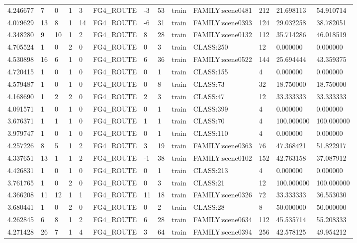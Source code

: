 \begin{tabular}{lllllllllllll}
4.246677 & 7 & 0 & 1 & 3 & FG4\_ROUTE & -3 & 53 & train & FAMILY:scene0481 & 212 & 21.698113 & 54.910714 \\
4.079629 & 13 & 8 & 1 & 14 & FG4\_ROUTE & -6 & 31 & train & FAMILY:scene0393 & 124 & 29.032258 & 38.782051 \\
4.348280 & 9 & 10 & 1 & 2 & FG4\_ROUTE & 8 & 28 & train & FAMILY:scene0132 & 112 & 35.714286 & 46.018519 \\
4.705524 & 1 & 0 & 2 & 0 & FG4\_ROUTE & 0 & 3 & train & CLASS:250 & 12 & 0.000000 & 0.000000 \\
4.530898 & 16 & 6 & 1 & 0 & FG4\_ROUTE & 6 & 36 & train & FAMILY:scene0522 & 144 & 25.694444 & 43.359375 \\
4.720415 & 1 & 0 & 1 & 0 & FG4\_ROUTE & 0 & 1 & train & CLASS:155 & 4 & 0.000000 & 0.000000 \\
4.579487 & 1 & 0 & 1 & 0 & FG4\_ROUTE & 0 & 8 & train & CLASS:73 & 32 & 18.750000 & 18.750000 \\
4.168690 & 1 & 2 & 2 & 0 & FG4\_ROUTE & 2 & 3 & train & CLASS:47 & 12 & 33.333333 & 33.333333 \\
4.091571 & 1 & 0 & 1 & 0 & FG4\_ROUTE & 0 & 1 & train & CLASS:399 & 4 & 0.000000 & 0.000000 \\
3.676371 & 1 & 1 & 1 & 0 & FG4\_ROUTE & 1 & 1 & train & CLASS:70 & 4 & 100.000000 & 100.000000 \\
3.979747 & 1 & 0 & 1 & 0 & FG4\_ROUTE & 0 & 1 & train & CLASS:110 & 4 & 0.000000 & 0.000000 \\
4.257226 & 8 & 5 & 1 & 2 & FG4\_ROUTE & 3 & 19 & train & FAMILY:scene0363 & 76 & 47.368421 & 51.822917 \\
4.337651 & 13 & 1 & 1 & 2 & FG4\_ROUTE & -1 & 38 & train & FAMILY:scene0102 & 152 & 42.763158 & 37.087912 \\
4.426831 & 1 & 0 & 1 & 0 & FG4\_ROUTE & 0 & 1 & train & CLASS:213 & 4 & 0.000000 & 0.000000 \\
3.761765 & 1 & 0 & 2 & 0 & FG4\_ROUTE & 0 & 3 & train & CLASS:21 & 12 & 100.000000 & 100.000000 \\
4.366208 & 11 & 12 & 1 & 1 & FG4\_ROUTE & 11 & 18 & train & FAMILY:scene0326 & 72 & 33.333333 & 36.553030 \\
3.680441 & 1 & 0 & 2 & 0 & FG4\_ROUTE & 0 & 2 & train & CLASS:28 & 8 & 50.000000 & 50.000000 \\
4.262845 & 6 & 8 & 1 & 2 & FG4\_ROUTE & 6 & 28 & train & FAMILY:scene0634 & 112 & 45.535714 & 55.208333 \\
4.271428 & 26 & 7 & 1 & 4 & FG4\_ROUTE & 3 & 64 & train & FAMILY:scene0394 & 256 & 42.578125 & 49.954212 \\

\end{tabular}
